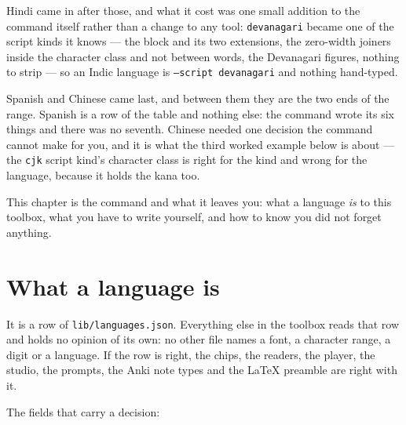 \documentclass[11pt,oneside]{report}
\newcommand{\file}[1]{\texttt{#1}}
\begin{document}
Hindi came in after those, and what it cost was one small addition to the
command itself rather than a change to any tool: \texttt{devanagari} became
one of the script kinds it knows --- the block and its two extensions, the
zero-width joiners inside the character class and not between words, the
Devanagari figures, nothing to strip --- so an Indic language is
\texttt{--script devanagari} and nothing hand-typed.

Spanish and Chinese came last, and between them they are the two ends of the
range. Spanish is a row of the table and nothing else: the command wrote its
six things and there was no seventh. Chinese needed one decision the command
cannot make for you, and it is what the third worked example below is about
--- the \texttt{cjk} script kind's character class is right for the kind and
wrong for the language, because it holds the kana too.

This chapter is the command and what it leaves you: what a language
\emph{is} to this toolbox, what you have to write yourself, and how to know
you did not forget anything.

\section{What a language is}

It is a row of \file{lib/languages.json}. Everything else in the toolbox reads
that row and holds no opinion of its own: no other file names a font, a
character range, a digit or a language. If the row is right, the chips, the
readers, the player, the studio, the prompts, the Anki note types and the
LaTeX preamble are right with it.

The fields that carry a decision:
\end{document}
